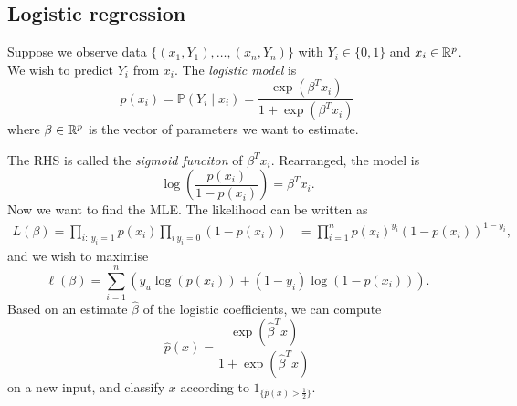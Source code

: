 \documentclass{article}
\begin{document}
\subsection{Logistic regression}
Suppose we observe data $ \{(x_1,Y_1),\dots, (x_n,Y_n)\} $ with $ Y_i\in \{0,1\} $ and $ x_i \in \mathbb{R}^p $. We wish to predict $ Y_i $ from $ x_i $. The \textit{logistic model} is
	\[
	p(x_i) = \mathbb P(Y_i\mid x_i) = \frac{\exp(\beta^T x_i)}{1+\exp(\beta^T x_i)}
	\]
	where $ \beta\in\mathbb{R}^p $ is the vector of parameters we want to estimate.\par
	The RHS is called the \textit{sigmoid funciton} of $ \beta^T x_i $. Rearranged, the model is
	\[
		\log\left(\frac{p(x_i)}{1-p(x_i)}\right) = \beta^T x_i.
	\]
Now we want to find the MLE. The likelihood can be written as
\begin{align*}
L(\beta) = \prod_{i:\ y_i = 1} p(x_i) \prod_{i\ y_i=0} (1-p(x_i)) &= \prod_{i=1}^n p(x_i)^{y_i}(1-p(x_i))^{1-y_i},
\end{align*}
and we wish to maximise
\[
	\ell(\beta) = \sum_{i=1}^n (y_u\log(p(x_i)) + (1-y_i)\log(1-p(x_i))).
\]
Based on an estimate $ \hat\beta $ of the logistic coefficients, we can compute
\[
	\hat p(x) = \frac{\exp(\hat\beta^T x)}{1+\exp(\hat\beta^T x)}
\]
on a new input, and classify $ x $ according to $ 1_{\{\hat p(x) > \frac 12\}} $.
\end{document}
